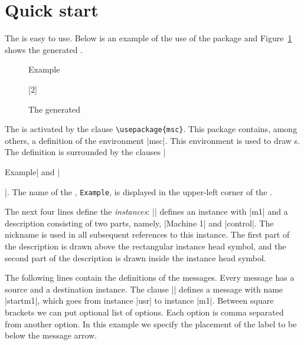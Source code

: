 \documentclass[12pt,a4paper]{article}
\begin{document}
\section{Quick start}
\label{quickstart}
The \mscpack{} is easy to use.
Below is an example of the use of the package and
Figure~\ref{quick} shows the generated \MSC{}.
\begin{figure}[htbp]
\begin{center}
\begin{codeexample}[width=\linewidth-6.8cm]
\begin{msc}{Example}

\nextlevel
{}
\nextlevel
{}
\nextlevel
\nextlevel
{}[2]
\nextlevel
\end{msc}
\end{codeexample}
\end{center}
\caption{The generated \MSC{}}
\label{quick}
\end{figure}
The \mscpack{} is activated by the clause \verb+\usepackage{msc}+. This package
contains, among others, a definition of the environment |msc|. This
environment is used to draw \MSC{}s. The \MSC{} definition is surrounded by the
clauses |\begin{msc}{Example}| and |\end{msc}|. The name of the
\MSC{}, {\tt Example}, is displayed in the upper-left corner of the \MSC{}.

The next four lines define the \emph{instances}:
|| defines an instance with
 |m1| and a description consisting of two parts,
namely, |Machine 1| and |control|.  The nickname is used in
all subsequent references to this instance.  The first part of the
description is drawn above the rectangular instance head symbol, and
the second part of the description is drawn inside the instance head
symbol.

The following lines contain the definitions of the messages. Every
message has a source and a destination instance. The clause
|| defines a message with name
|startm1|, which goes from instance |usr| to instance |m1|.
Between square brackets we can put optional list of options. Each option is
comma separated from another option. In this example we specify the placement of
the label to be below the message arrow.
\end{document}

